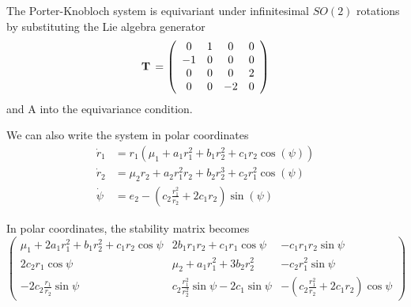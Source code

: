 \documentclass{article}
\begin{document}
The Porter-Knobloch system is equivariant under infinitesimal $SO(2)$ rotations by substituting the Lie algebra generator
    \begin{equation}
\mathbf{T}  \, =
\left( \begin{array}{cccc}
         0 & 1 & 0 & 0 \\
        -1 & 0 & 0 & 0 \\
         0 & 0 & 0 & 2\\
         0 & 0 & -2 & 0
      \end{array} \right)
\label{{LGTwoMode}}
\end{equation}
and A into the equivariance condition.

We can also write the system in polar coordinates
\begin{align}
\dot{r}_1&=r_1(\mu_1+a_1r_1^2+b_1r_2^2+c_1r_2\cos(\psi))\\
\dot{r}_2&=\mu_2r_2+a_2r_1^2r_2+b_2r_2^3+c_2r_1^2\cos(\psi)\\
\dot{\psi}&=e_2-(c_2\frac{r_1^2}{r_2}+2c_1r_2)\sin(\psi)
\end{align}

In polar coordinates, the stability matrix becomes
\begin{equation}
\left(\begin{array}{ccc}
\mu_1+2a_1r_1^2+b_1r_2^2+c_1r_2\cos\psi & 2b_1r_1r_2+c_1r_1\cos\psi & -c_1r_1r_2\sin\psi\\
2c_2r_1\cos\psi & \mu_2+a_1r_1^2+3b_2r_2^2 & -c_2r_1^2\sin\psi\\
-2c_2\frac{r_1}{r_2}\sin\psi & c_2\frac{r_1^2}{r_2^2}\sin\psi-2c_1\sin\psi & -(c_2\frac{r_1^2}{r_2}+2c_1r_2)\cos\psi
\end{array}\right)
\end{equation}
\end{document}
